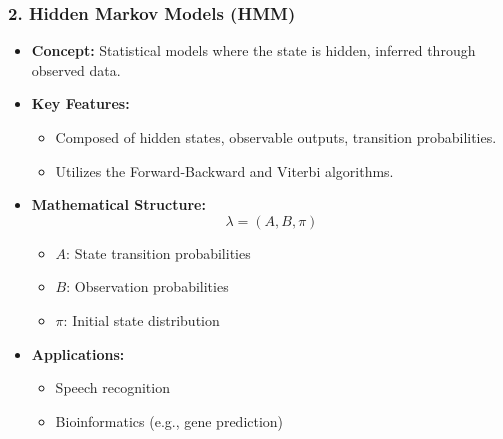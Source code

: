 \documentclass[aspectratio=169]{beamer}
\begin{document}
\begin{frame}[fragile]
    \frametitle{2. Hidden Markov Models (HMM)}
    \begin{itemize}
        \item \textbf{Concept:} Statistical models where the state is hidden, inferred through observed data.
        \item \textbf{Key Features:}
        \begin{itemize}
            \item Composed of hidden states, observable outputs, transition probabilities.
            \item Utilizes the Forward-Backward and Viterbi algorithms.
        \end{itemize}
        \item \textbf{Mathematical Structure:}
        \begin{equation}
            \lambda = (A, B, \pi)
        \end{equation}
        \begin{itemize}
            \item \( A \): State transition probabilities
            \item \( B \): Observation probabilities
            \item \( \pi \): Initial state distribution
        \end{itemize}
        \item \textbf{Applications:}
        \begin{itemize}
            \item Speech recognition
            \item Bioinformatics (e.g., gene prediction)
        \end{itemize}
    \end{itemize}
\end{frame}
\end{document}
